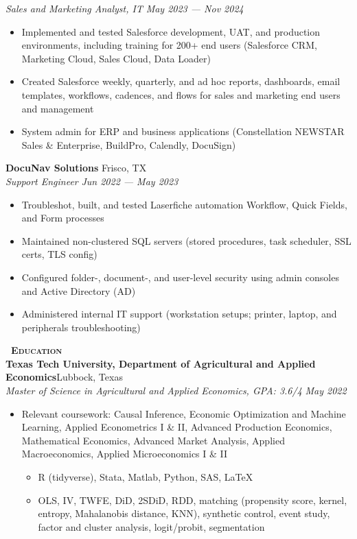 \documentclass[a4paper,11pt]{article}
\newcommand{\header} [1] {
    \vspace{0.5mm}
    {\textsc{\textbf{\Large{\xrfill[0.5ex]{0.5pt}~#1~\xrfill[0.5ex]{0.5pt}}}}} %
}
\begin{document}
\textit{Sales and Marketing Analyst, IT} \hfill  \textit{May 2023 --- Nov 2024} \\
\begin{itemize}
    \item Implemented and tested Salesforce development, UAT, and production environments, including training for 200+ end users (Salesforce CRM, Marketing Cloud, Sales Cloud, Data Loader) 
    \item Created Salesforce weekly, quarterly, and ad hoc reports, dashboards, email templates, workflows, cadences, and flows for sales and marketing end users and management
    \item System admin for ERP and business applications (Constellation NEWSTAR Sales \& Enterprise, BuildPro, Calendly, DocuSign)
\end{itemize}
\vspace{0.5mm}

\textbf{DocuNav Solutions} \hfill Frisco, TX \\
\textit{Support Engineer} \hfill  \textit{Jun 2022 --- May 2023} \\
\begin{itemize}
    \item Troubleshot, built, and tested Laserfiche automation Workflow, Quick Fields, and Form processes
    \item Maintained non-clustered SQL servers (stored procedures, task scheduler, SSL certs, TLS config)
    \item Configured folder-, document-, and user-level security using admin consoles and Active Directory (AD)
    \item Administered internal IT support (workstation setups; printer, laptop, and peripherals troubleshooting)
\end{itemize}    
\vspace{0.5mm}


\header{Education} \\
\vspace{0.5mm}
\textbf{Texas Tech University, Department of Agricultural and Applied Economics}\hfill Lubbock, Texas\\
\textit{Master of Science in Agricultural and Applied Economics, GPA: 3.6/4} \hfill  \textit{May 2022} \\
\begin{itemize}
    \item Relevant coursework: Causal Inference, Economic Optimization and Machine Learning, Applied Econometrics I \& II, Advanced Production Economics, Mathematical Economics, Advanced Market Analysis, Applied Macroeconomics, Applied Microeconomics I \& II
    \begin{itemize}
        \item R (tidyverse), Stata, Matlab, Python, SAS, \LaTeX
        \item OLS, IV, TWFE, DiD, 2SDiD, RDD, matching (propensity score, kernel, entropy, Mahalanobis distance,  KNN), synthetic control, event study, factor and cluster analysis, logit/probit, segmentation
    \end{itemize}
\end{itemize}
\vspace{0.5mm}
\end{document}
